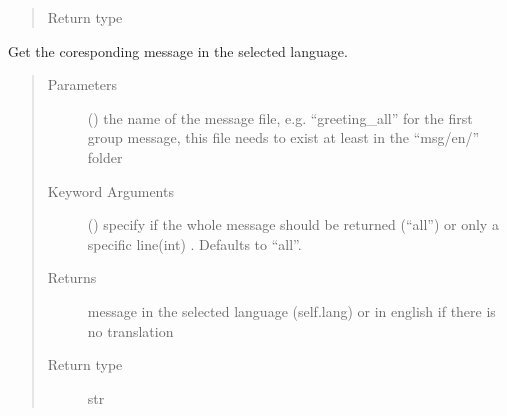 \documentclass[letterpaper,10pt,english]{sphinxmanual}
\begin{document}
\begin{fulllineitems}
\begin{fulllineitems}
\begin{quote}
\begin{description}
\item[{Return type}] \leavevmode
{\hyperref[\detokenize{chatwolf:chatwolf.game.Game}]{}}

\end{description}\end{quote}

\end{fulllineitems}


\begin{fulllineitems}
\label{\detokenize{chatwolf:chatwolf.game.Game.msg}}
Get the coresponding message in the selected language.
\begin{quote}\begin{description}
\item[{Parameters}] \leavevmode
{} () \textendash{} the name of the message file,
e.g. “greeting\_all” for the first group message,
this file needs to exist at least in the “msg/en/” folder

\item[{Keyword Arguments}] \leavevmode
{} (\sphinxstyleliteralemphasis{\sphinxupquote{, }}) \textendash{} specify if the whole message should be returned (“all”)
or only a specific line(int) . Defaults to “all”.

\item[{Returns}] \leavevmode
message in the selected language (self.lang) or in english if there is no translation

\item[{Return type}] \leavevmode
str

\end{description}\end{quote}

\end{fulllineitems}



\end{fulllineitems}
\end{document}
